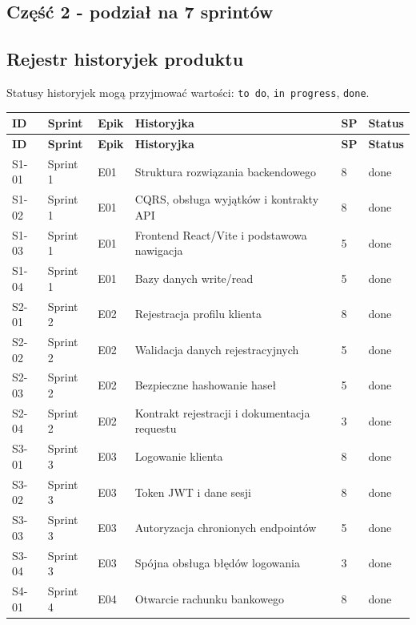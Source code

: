 \documentclass[12pt,a4paper]{article}
\begin{document}
\subsection*{Część 2 - podział na 7 sprintów}

\subsection*{Rejestr historyjek produktu}

Statusy historyjek mogą przyjmować wartości: \texttt{to do}, \texttt{in progress}, \texttt{done}.

\begingroup
\footnotesize
{}
\begin{longtable}{@{}L{0.08\textwidth}L{0.12\textwidth}L{0.10\textwidth}L{0.42\textwidth}C{0.06\textwidth}L{0.12\textwidth}@{}}
\toprule
{}
\textbf{ID} & \textbf{Sprint} & \textbf{Epik} & \textbf{Historyjka} & \textbf{SP} & \textbf{Status} \\
\midrule
\endfirsthead
\toprule
{}
\textbf{ID} & \textbf{Sprint} & \textbf{Epik} & \textbf{Historyjka} & \textbf{SP} & \textbf{Status} \\
\midrule
\endhead
S1-01 & Sprint 1 & E01 & Struktura rozwiązania backendowego & 8 & done \\
S1-02 & Sprint 1 & E01 & CQRS, obsługa wyjątków i kontrakty API & 8 & done \\
S1-03 & Sprint 1 & E01 & Frontend React/Vite i podstawowa nawigacja & 5 & done \\
S1-04 & Sprint 1 & E01 & Bazy danych write/read & 5 & done \\
S2-01 & Sprint 2 & E02 & Rejestracja profilu klienta & 8 & done \\
S2-02 & Sprint 2 & E02 & Walidacja danych rejestracyjnych & 5 & done \\
S2-03 & Sprint 2 & E02 & Bezpieczne hashowanie haseł & 5 & done \\
S2-04 & Sprint 2 & E02 & Kontrakt rejestracji i dokumentacja requestu & 3 & done \\
S3-01 & Sprint 3 & E03 & Logowanie klienta & 8 & done \\
S3-02 & Sprint 3 & E03 & Token JWT i dane sesji & 8 & done \\
S3-03 & Sprint 3 & E03 & Autoryzacja chronionych endpointów & 5 & done \\
S3-04 & Sprint 3 & E03 & Spójna obsługa błędów logowania & 3 & done \\
S4-01 & Sprint 4 & E04 & Otwarcie rachunku bankowego & 8 & done \\

\end{longtable}
\end{document}
